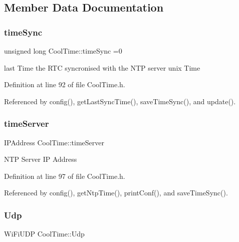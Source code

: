 \subsection{Member Data Documentation}
\mbox{\label{class_cool_time_a9d032e76c3470a15b3bbbc52af6463f7}} 
\subsubsection{\texorpdfstring{time\+Sync}{timeSync}}
{\footnotesize\ttfamily unsigned long Cool\+Time\+::time\+Sync =0\hspace{0.3cm}{\ttfamily [private]}}

last Time the R\+TC syncronised with the N\+TP server unix Time 

Definition at line 92 of file Cool\+Time.\+h.



Referenced by config(), get\+Last\+Sync\+Time(), save\+Time\+Sync(), and update().

\mbox{\label{class_cool_time_ad2b9858f399108cb440dd1e908916f04}} 
\subsubsection{\texorpdfstring{time\+Server}{timeServer}}
{\footnotesize\ttfamily I\+P\+Address Cool\+Time\+::time\+Server\hspace{0.3cm}{\ttfamily [private]}}

N\+TP Server IP Address 

Definition at line 97 of file Cool\+Time.\+h.



Referenced by config(), get\+Ntp\+Time(), print\+Conf(), and save\+Time\+Sync().

\mbox{\label{class_cool_time_a4e23216a8121ca79d0fb019f30884b92}} 
\subsubsection{\texorpdfstring{Udp}{Udp}}
{\footnotesize\ttfamily Wi\+Fi\+U\+DP Cool\+Time\+::\+Udp\hspace{0.3cm}{\ttfamily [private]}}

